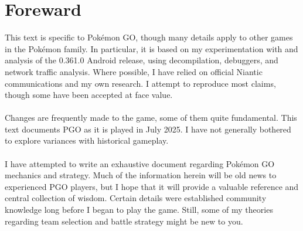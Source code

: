 \chapter{Foreward}

\noindent{}This text is specific to Pokémon GO, though many details
apply to other games in the Pokémon family.
In particular, it is based on my experimentation with and analysis of
 the 0.361.0 Android release, using decompilation, debuggers, and
 network traffic analysis.
Where possible, I have relied on official Niantic communications
 and my own research.
I attempt to reproduce most claims, though some have been accepted at face value.\\
\\
\noindent{}Changes are frequently made to the game, some of them quite fundamental.
This text documents PGO as it is played in July 2025.
I have not generally bothered to explore variances with historical gameplay.\\
\\
\noindent{}I have attempted to write an exhaustive document regarding Pokémon GO
 mechanics and strategy.
Much of the information herein will be old news to experienced
 PGO players, but I hope that it will provide a valuable
 reference and central collection of wisdom.
Certain details were established community knowledge long before I
 began to play the game.
Still, some of my theories regarding team selection and battle strategy might
  be new to you.
